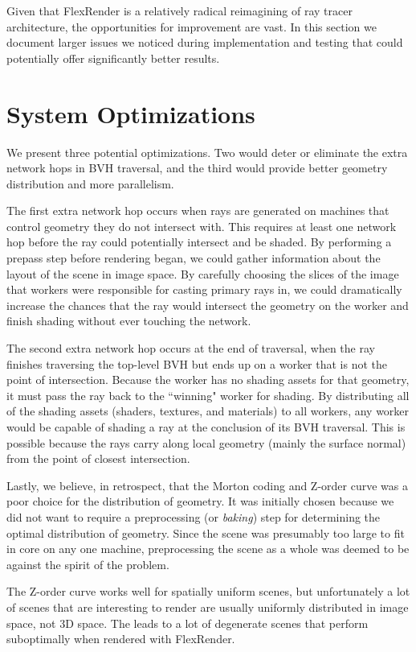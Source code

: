 \documentclass[12pt]{ucthesis}
\begin{document}
Given that FlexRender is a relatively radical reimagining of ray tracer
architecture, the opportunities for improvement are vast. In this section we
document larger issues we noticed during implementation and testing that
could potentially offer significantly better results.

\section{System Optimizations}
\label{optimizations}

We present three potential optimizations. Two would deter or eliminate the
extra network hops in BVH traversal, and the third would provide better
geometry distribution and more parallelism.

The first extra network hop occurs when rays are generated on machines that
control geometry they do not intersect with. This requires at least one
network hop before the ray could potentially intersect and be shaded. By performing
a prepass step before rendering began, we could gather information about the
layout of the scene in image space. By carefully choosing the slices of the
image that workers were responsible for casting primary rays in, we could
dramatically increase the chances that the ray would intersect the geometry
on the worker and finish shading without ever touching the network.

The second extra network hop occurs at the end of traversal, when the ray finishes
traversing the top-level BVH but ends up on a worker that is not the point of
intersection. Because the worker has no shading assets for that geometry, it
must pass the ray back to the ``winning" worker for shading. By distributing
all of the shading assets (shaders, textures, and materials) to all workers,
any worker would be capable of shading a ray at the conclusion of its BVH traversal.
This is possible because the rays carry along local geometry (mainly the surface
normal) from the point of closest intersection.

Lastly, we believe, in retrospect, that the Morton coding and Z-order curve was
a poor choice for the distribution of geometry. It was initially chosen because
we did not want to require a preprocessing (or \emph{baking}) step for
determining the optimal distribution of geometry. Since the scene was presumably
too large to fit in core on any one machine, preprocessing the scene as a whole
was deemed to be against the spirit of the problem.

The Z-order curve works well for spatially uniform scenes, but unfortunately a
lot of scenes that are interesting to render are usually uniformly distributed
in image space, not 3D space. The leads to a lot of degenerate scenes that
perform suboptimally when rendered with FlexRender.
\end{document}
